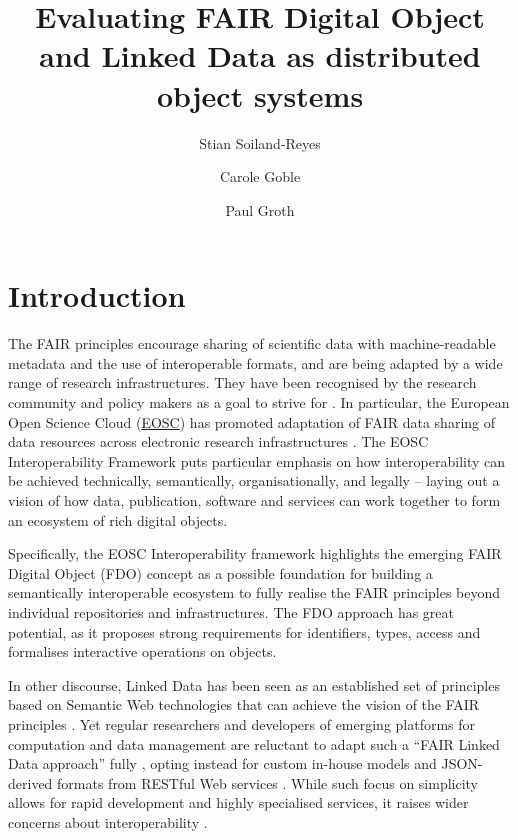 \documentclass[fleqn,10pt,lineno]{wlpeerjlua}
\title{Evaluating FAIR Digital Object and Linked Data as distributed object systems}
\author[1,2]{Stian Soiland-Reyes} %
\author[1]{Carole Goble}          %
\author[2]{Paul Groth}            %
\affil[1]{Department of Computer Science, The University of Manchester, UK}
\affil[2]{Informatics Institute, Faculty of Science, University of Amsterdam, NL }
\begin{document}
\flushbottom
\maketitle
\thispagestyle{empty}


\section*{Introduction}\label{sec:introduction}

The FAIR principles \autocite{wilkinsonFAIRGuidingPrinciples2016e} encourage sharing of scientific data with machine-readable metadata and the use of interoperable formats, and are being adapted by a wide range of research infrastructures. They have been recognised by the research community and policy makers as a goal to strive for \autocite{h2020fair2016}. In particular, the European Open Science Cloud (\href{https://www.eosc.eu/}{EOSC}) has promoted adaptation of FAIR data sharing of data resources across electronic research infrastructures \autocite{monsCloudyIncreasinglyFAIR2017b}. The EOSC Interoperability Framework \autocite{corchoEOSCInteroperabilityFramework2021b} puts particular emphasis on how interoperability can be achieved technically, semantically, organisationally, and legally -- laying out a vision of how data, publication, software and services can work together to form an ecosystem of rich digital objects.

Specifically, the EOSC Interoperability framework highlights the emerging FAIR Digital Object (FDO) concept \autocite{schultesFAIRPrinciplesDigital2019a} as a possible foundation for building a semantically interoperable ecosystem to fully realise the FAIR principles beyond individual repositories and infrastructures. The FDO approach has great potential, as it proposes strong requirements for identifiers, types, access and formalises interactive operations on objects.

In other discourse, Linked Data \autocite{bizerLinkedDataStory2009a} has been seen as an established set of principles based on Semantic Web technologies that can achieve the vision of the FAIR principles \autocite{boninodasilvasantosFAIRDataPoints2016a,hasnainAssessingFAIRData2018a}. Yet regular researchers and developers of emerging platforms for computation and data management are reluctant to adapt such a ``FAIR Linked Data approach'' fully \autocite{verborghSemanticWebIdentity2020a}, opting instead for custom in-house models and JSON-derived formats from RESTful Web services \autocite{merono-penuelaConclusionFutureChallenges2021a,neumannAnalysisPublicREST2021a}. While such focus on simplicity allows for rapid development and highly specialised services, it raises wider concerns about interoperability \autocite{turcoaneLinkedDataJSONLD2014a,wilkinsonWorkflowsWhenParts2022b}.
\end{document}
